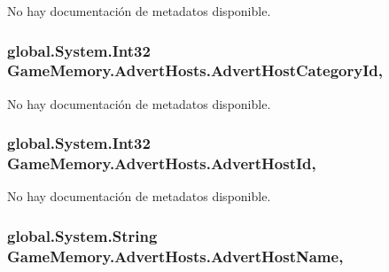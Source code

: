 No hay documentación de metadatos disponible. 

\hypertarget{class_game_memory_1_1_advert_hosts_adb9878a533fd009839d66c95d514e075}{
\subsubsection[{Advert\-Host\-Category\-Id}]{\setlength{\rightskip}{0pt plus 5cm}global.\-System.\-Int32 Game\-Memory.\-Advert\-Hosts.\-Advert\-Host\-Category\-Id\hspace{0.3cm}{\ttfamily [get]}, {\ttfamily [set]}}}\label{class_game_memory_1_1_advert_hosts_adb9878a533fd009839d66c95d514e075}


No hay documentación de metadatos disponible. 

\hypertarget{class_game_memory_1_1_advert_hosts_a050c3c580d2c90577cabff79c565fdbc}{
\subsubsection[{Advert\-Host\-Id}]{\setlength{\rightskip}{0pt plus 5cm}global.\-System.\-Int32 Game\-Memory.\-Advert\-Hosts.\-Advert\-Host\-Id\hspace{0.3cm}{\ttfamily [get]}, {\ttfamily [set]}}}\label{class_game_memory_1_1_advert_hosts_a050c3c580d2c90577cabff79c565fdbc}


No hay documentación de metadatos disponible. 

\hypertarget{class_game_memory_1_1_advert_hosts_a5738204678324f4adb8a9b54c1331a08}{
\subsubsection[{Advert\-Host\-Name}]{\setlength{\rightskip}{0pt plus 5cm}global.\-System.\-String Game\-Memory.\-Advert\-Hosts.\-Advert\-Host\-Name\hspace{0.3cm}{\ttfamily [get]}, {\ttfamily [set]}}}\label{class_game_memory_1_1_advert_hosts_a5738204678324f4adb8a9b54c1331a08}


